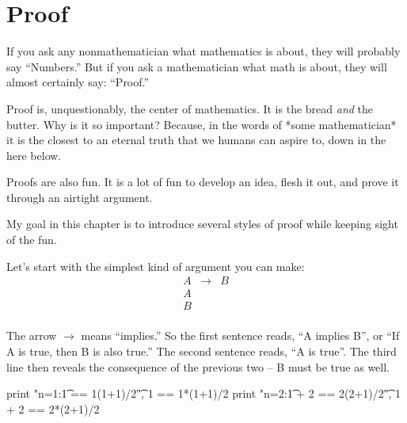 \chapter{Proof}

If you ask any nonmathematician what mathematics is about, they will
probably say ``Numbers.''  But if you ask a mathematician what
math is about, they will almost certainly say: ``Proof.''

Proof is, unquestionably, the center of mathematics.  It is the bread
\emph{and} the butter.  Why is it so important?  Because, in the words
of *some mathematician* it is the closest to an eternal truth that we
humans can aspire to, down in the here below.

Proofs are also fun.  It is a lot of fun to develop an idea, flesh it
out, and prove it through an airtight argument.

My goal in this chapter is to introduce several styles of proof while
keeping sight of the fun.

Let's start with the simplest kind of argument you can make:
\begin{eqnarray}
 A & \longrightarrow & B \\
 A & & \\
 B & & \\
\end{eqnarray}

The arrow $\longrightarrow$ means ``implies.''  So the first sentence
reads, ``A implies B'', or ``If A is true, then B is also true.''  The
second sentence reads, ``A is true''.  The third line then reveals the
consequence of the previous two -- B must be true as well.

\begin{sageverbatim}
print "n=1:\t     1 == 1(1+1)/2\t", 1 == 1*(1+1)/2  
print "n=2:\t 1 + 2 == 2(2+1)/2\t", 1 + 2 == 2*(2+1)/2
\end{sageverbatim}

